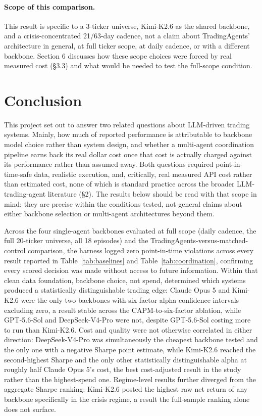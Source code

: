 \documentclass{article}
\begin{document}
\paragraph{Scope of this comparison.} This result is specific to a 3-ticker universe, Kimi-K2.6 as the shared backbone, and a crisis-concentrated 21/63-day cadence, not a claim about TradingAgents' architecture in general, at full ticker scope, at daily cadence, or with a different backbone. Section 6 discusses how these scope choices were forced by real measured cost (\S3.3) and what would be needed to test the full-scope condition.

\section{Conclusion}

This project set out to answer two related questions about LLM-driven trading systems. Mainly, how much of reported performance is attributable to backbone model choice rather than system design, and whether a multi-agent coordination pipeline earns back its real dollar cost once that cost is actually charged against its performance rather than assumed away. Both questions required point-in-time-safe data, realistic execution, and, critically, real measured API cost rather than estimated cost, none of which is standard practice across the broader LLM-trading-agent literature (\S2). The results below should be read with that scope in mind: they are precise within the conditions tested, not general claims about either backbone selection or multi-agent architectures beyond them.

Across the four single-agent backbones evaluated at full scope (daily cadence, the full 20-ticker universe, all 18 episodes) and the TradingAgents-versus-matched-control comparison, the harness logged zero point-in-time violations across every result reported in Table~\ref{tab:baselines} and Table~\ref{tab:coordination}, confirming every scored decision was made without access to future information. Within that clean data foundation, backbone choice, not spend, determined which systems produced a statistically distinguishable trading edge: Claude Opus 5 and Kimi-K2.6 were the only two backbones with six-factor alpha confidence intervals excluding zero, a result stable across the CAPM-to-six-factor ablation, while GPT-5.6-Sol and DeepSeek-V4-Pro were not, despite GPT-5.6-Sol costing more to run than Kimi-K2.6. Cost and quality were not otherwise correlated in either direction: DeepSeek-V4-Pro was simultaneously the cheapest backbone tested and the only one with a negative Sharpe point estimate, while Kimi-K2.6 reached the second-highest Sharpe and the only other statistically distinguishable alpha at roughly half Claude Opus 5's cost, the best cost-adjusted result in the study rather than the highest-spend one. Regime-level results further diverged from the aggregate Sharpe ranking: Kimi-K2.6 posted the highest raw net return of any backbone specifically in the crisis regime, a result the full-sample ranking alone does not surface.
\end{document}
